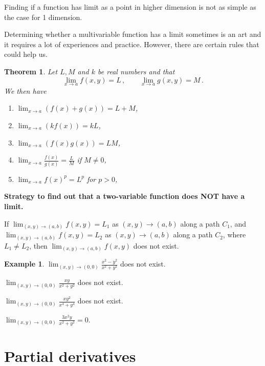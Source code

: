 \documentclass[
]{book}
\newtheorem{theorem}{Theorem}[chapter]
\theoremstyle{definition}
\theoremstyle{definition}
\newtheorem{example}{Example}[chapter]
\theoremstyle{definition}
\theoremstyle{definition}
\theoremstyle{remark}
\begin{document}
Finding if a function has limit as a point in higher dimension is not as simple as
the case for 1 dimension.

Determining whether a multivariable function has a limit sometimes is an art
and it requires a lot of experiences and practice.
However, there are certain rules that could help us.

\begin{theorem}

Let \(L,M\) and \(k\) be real numbers and that
\begin{equation*}
    \lim_{x \to a} f(x,y) = L \,, \qquad 
    \lim_{x \to a} g(x,y) = M \,.
\end{equation*}
We then have

\begin{enumerate}
\def\labelenumi{\arabic{enumi}.}
\item
  \(\displaystyle \lim_{x \to a} (f(x) + g(x)) = L + M\),
\item
  \(\displaystyle \lim_{x \to a} (k f(x)) = kL\),
\item
  \(\displaystyle \lim_{x \to a} (f(x) g(x)) = LM\),
\item
  \(\displaystyle \lim_{x \to a} \frac{f(x)}{g(x)} = \frac{L}{M}\) if \(M \not= 0\),
\item
  \(\displaystyle \lim_{x \to a} {f(x)^p} = L^p\) for \(p>0\),
\end{enumerate}

\end{theorem}

\textbf{Strategy to find out that a two-variable function does NOT have a limit.}

If \(\lim_{(x,y) \to (a,b)} f(x,y) = L_1\) as \((x,y) \to (a,b)\) along a path \(C_1\),
and \(\lim_{(x,y) \to (a,b)} f(x,y) = L_2\) as \((x,y) \to (a,b)\) along a path \(C_2\),
where \(L_1 \neq L_2\), then \(\lim_{(x,y) \to (a,b)} f(x,y)\) does not exist.

\begin{example}
\(\lim_{(x,y)\to (0,0)} \frac{x^2 - y^2}{x^2 + y^2}\) does not exist.

\(\lim_{(x,y)\to (0,0)} \frac{xy}{x^2 + y^2}\) does not exist.

\(\lim_{(x,y)\to (0,0)} \frac{xy^2}{x^4 + y^4}\) does not exist.

\(\lim_{(x,y)\to (0,0)} \frac{3x^2y}{x^2 + y^2} = 0\).
\end{example}

\hypertarget{partial-derivatives-1}{%
\section{Partial derivatives}\label{partial-derivatives-1}}
\end{document}
